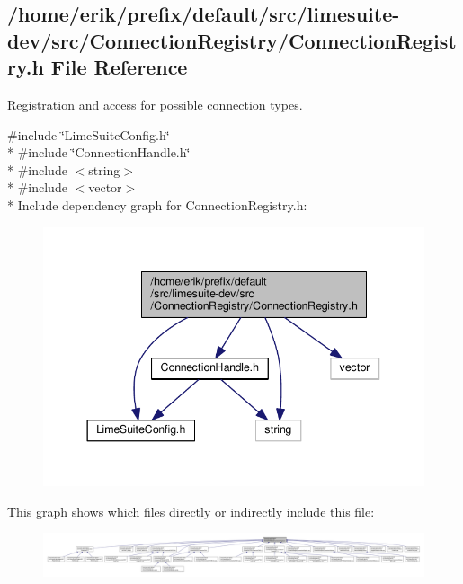 \subsection{/home/erik/prefix/default/src/limesuite-\/dev/src/\+Connection\+Registry/\+Connection\+Registry.h File Reference}
\label{ConnectionRegistry_8h}


Registration and access for possible connection types.  


{\ttfamily \#include \char`\"{}Lime\+Suite\+Config.\+h\char`\"{}}\\*
{\ttfamily \#include \char`\"{}Connection\+Handle.\+h\char`\"{}}\\*
{\ttfamily \#include $<$string$>$}\\*
{\ttfamily \#include $<$vector$>$}\\*
Include dependency graph for Connection\+Registry.\+h\+:
\nopagebreak
\begin{figure}[H]
\begin{center}
\leavevmode
\includegraphics[width=344pt]{dc/d0d/ConnectionRegistry_8h__incl}
\end{center}
\end{figure}
This graph shows which files directly or indirectly include this file\+:
\nopagebreak
\begin{figure}[H]
\begin{center}
\leavevmode
\includegraphics[width=350pt]{d2/d16/ConnectionRegistry_8h__dep__incl}
\end{center}
\end{figure}
